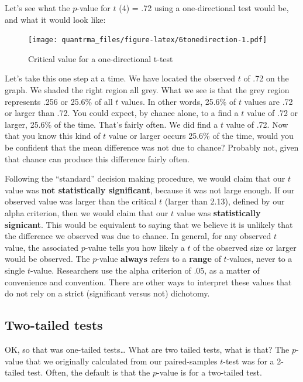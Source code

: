 \documentclass[
]{book}
\begin{document}
Let's see what the \(p\)-value for \(t\) (4) = .72 using a one-directional test would be, and what it would look like:

\begin{figure}
\centering
\texttt{[image: quantrma\_files/figure-latex/6tonedirection-1.pdf]}
\caption{\label{fig:6tonedirection}Critical value for a one-directional t-test}
\end{figure}

Let's take this one step at a time. We have located the observed \(t\) of .72 on the graph. We shaded the right region all grey. What we see is that the grey region represents .256 or 25.6\% of all \(t\) values. In other words, 25.6\% of \(t\) values are .72 or larger than .72. You could expect, by chance alone, to a find a \(t\) value of .72 or larger, 25.6\% of the time. That's fairly often. We did find a \(t\) value of .72. Now that you know this kind of \(t\) value or larger occurs 25.6\% of the time, would you be confident that the mean difference was not due to chance? Probably not, given that chance can produce this difference fairly often.

Following the ``standard'' decision making procedure, we would claim that our \(t\) value was \textbf{not statistically significant}, because it was not large enough. If our observed value was larger than the critical \(t\) (larger than 2.13), defined by our alpha criterion, then we would claim that our \(t\) value was \textbf{statistically signicant}. This would be equivalent to saying that we believe it is unlikely that the difference we observed was due to chance. In general, for any observed \(t\) value, the associated \(p\)-value tells you how likely a \(t\) of the observed size or larger would be observed. The \(p\)-value \textbf{always} refers to a \textbf{range} of \(t\)-values, never to a single \(t\)-value. Researchers use the alpha criterion of .05, as a matter of convenience and convention. There are other ways to interpret these values that do not rely on a strict (significant versus not) dichotomy.

\hypertarget{two-tailed-tests}{%
\subsection{Two-tailed tests}\label{two-tailed-tests}}

OK, so that was one-tailed tests\ldots{} What are two tailed tests, what is that? The \(p\)-value that we originally calculated from our paired-samples \(t\)-test was for a 2-tailed test. Often, the default is that the \(p\)-value is for a two-tailed test.
\end{document}

